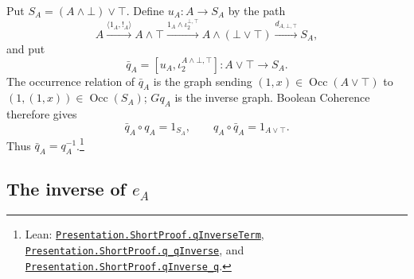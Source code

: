 \documentclass[11pt]{article}
\newcommand{\Occ}{\operatorname{Occ}}
\begin{document}
Put $S_A=(A\wedge\bot)\vee\top$. Define $u_A:A\to S_A$ by
the path
\[
 A\xrightarrow{\langle1_A,!_A\rangle}A\wedge\top
  \xrightarrow{1_A\wedge\iota_2^{\bot,\top}}A\wedge(\bot\vee\top)
  \xrightarrow{d_{A,\bot,\top}}S_A,
\]
and put
\[
 \bar q_A=[u_A,\iota_2^{A\wedge\bot,\top}]:
      A\vee\top\longrightarrow S_A.
\]
The occurrence relation of $\bar q_A$ is the graph sending
$(1,x)\in\Occ(A\vee\top)$ to
$(1,(1,x))\in\Occ(S_A)$; $Gq_A$ is the inverse graph.
Boolean Coherence therefore gives
\[
 \bar q_A\circ q_A=1_{S_A},\qquad
 q_A\circ\bar q_A=1_{A\vee\top}.
\]
Thus $\bar q_A=q_A^{-1}$.\footnote{\raggedright Lean:
\href{https://github.com/flengyel/Dosen-Petric-Maximality/blob/5dbee39bea09539bd130f729e82636419f71f920/DosenPetric/PresentationShortQ.lean\#L17}{\texttt{Presentation.ShortProof.\allowbreak{}qInverseTerm}},
\href{https://github.com/flengyel/Dosen-Petric-Maximality/blob/5dbee39bea09539bd130f729e82636419f71f920/DosenPetric/PresentationShortQ.lean\#L32}{\texttt{Presentation.ShortProof.\allowbreak{}q\_qInverse}}, and
\href{https://github.com/flengyel/Dosen-Petric-Maximality/blob/5dbee39bea09539bd130f729e82636419f71f920/DosenPetric/PresentationShortQ.lean\#L46}{\texttt{Presentation.ShortProof.\allowbreak{}qInverse\_q}}.}

\subsection{The inverse of \texorpdfstring{$e_A$}{eA}}
\end{document}
